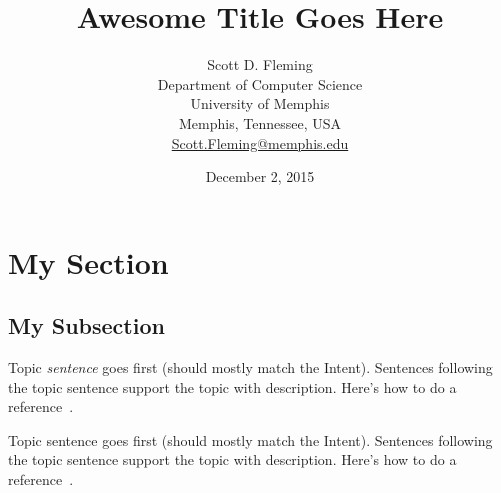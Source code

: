 \documentclass[11pt, letterpaper, onecolumn]{article}
\begin{document}

\title{Awesome Title Goes Here}

\author{%
Scott D. Fleming\\%
Department of Computer Science\\%
University of Memphis\\%
Memphis, Tennessee, USA\\%
\href{mailto:Scott.Fleming@memphis.edu}{Scott.Fleming@memphis.edu}%
}

\date{December 2, 2015}

\maketitle



\section{My Section}


\subsection{My Subsection}



%
Topic \emph{sentence} goes first (should mostly match the Intent).
%
Sentences following the topic sentence support the topic with description.
%
Here's how to do a reference~\cite{Robillard2004TSE}.



%
Topic sentence goes first (should mostly match the Intent).
%
Sentences following the topic sentence support the topic with description.
%
Here's how to do a reference~\cite{Robillard2004TSE}.







\end{document}
